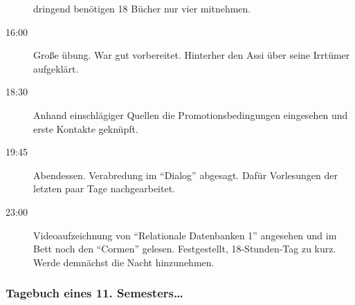 \begin{description}
dringend benötigen 18 Bücher nur vier mitnehmen.
\item[16:00] Große übung. War gut vorbereitet. Hinterher den Assi über seine
Irrtümer aufgeklärt.
\item[18:30] Anhand einschlägiger Quellen die Promotionsbedingungen eingesehen und
erste Kontakte geknüpft.
\item[19:45] Abendessen. Verabredung im "`Dialog"' abgesagt. Dafür Vorlesungen
der letzten paar Tage nachgearbeitet.
\item[23:00] Videoaufzeichnung von "`Relationale Datenbanken 1"' angesehen und im Bett noch den "`Cormen"'
gelesen. Festgestellt, 18-Stunden-Tag zu kurz. Werde demnächst die Nacht
hinzunehmen.
\end{description}
\newpage
\subsubsection{Tagebuch eines 11. Semesters\ldots}

